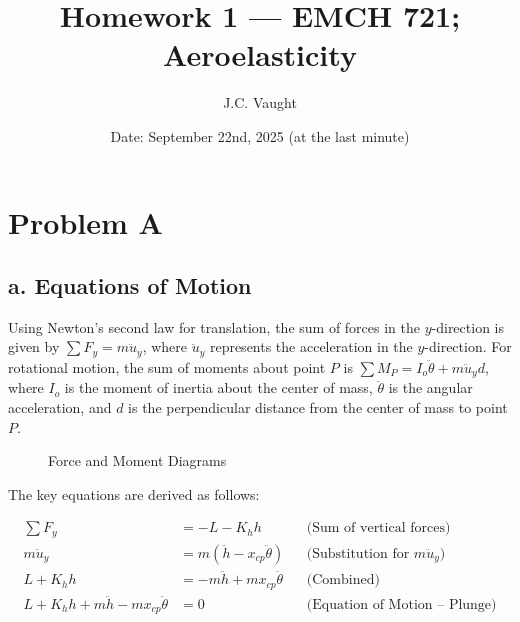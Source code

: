 \documentclass{article}
\title{Homework 1 --- EMCH 721; Aeroelasticity}
\author{J.C. Vaught}
\date{Date: September 22nd, 2025 (at the last minute)}
\begin{document}
\maketitle
\tableofcontents
\newpage
\section{Problem A}
\subsection{a. Equations of Motion}

Using Newton's second law for translation, the sum of forces in the $y$-direction is given by $\sum F_y = m \ddot{u}_y$, where $\ddot{u}_y$ represents the acceleration in the $y$-direction. For rotational motion, the sum of moments about point $P$ is $\sum M_P = I_o \ddot{\theta} + m \ddot{u}_y d$, where $I_o$ is the moment of inertia about the center of mass, $\ddot{\theta}$ is the angular acceleration, and $d$ is the perpendicular distance from the center of mass to point $P$.

\begin{figure}[htbp]
    \centering
    
    \caption{Force and Moment Diagrams}
    \label{fig:diagrams}
\end{figure}


\noindent The key equations are derived as follows:

\begin{align}
    \sum F_y &= -L - K_h h                           && \text{(Sum of vertical forces)} \label{eq:force_sum} \\
    m \ddot{u}_y &= m (\ddot{h} - x_{cp} \ddot{\theta})  && \text{(Substitution for } m \ddot{u}_y\text{)} \label{eq:accel_sub} \\
    L + K_h h &= -m \ddot{h} + m x_{cp} \ddot{\theta}    && \text{(Combined)} \label{eq:combined} \\
    L + K_h h + m \ddot{h} - m x_{cp} \ddot{\theta} &= 0 && \text{(Equation of Motion -- Plunge)} \label{eq:plunge_motion}%
\end{align}
\end{document}
